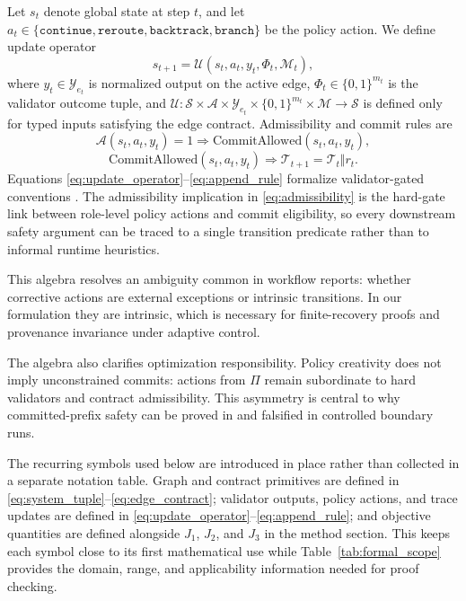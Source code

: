 \documentclass{article} %
\begin{document}
Let $s_t$ denote global state at step $t$, and let $a_t\in\{\texttt{continue},\texttt{reroute},\texttt{backtrack},\texttt{branch}\}$ be the policy action. We define update operator
\begin{equation}
s_{t+1}=\mathcal{U}(s_t,a_t,y_t,\Phi_t,\mathcal{M}_t),
\label{eq:update_operator}
\end{equation}
where $y_t\in\mathcal{Y}_{e_t}$ is normalized output on the active edge, $\Phi_t\in\{0,1\}^{m_t}$ is the validator outcome tuple, and $\mathcal{U}:\mathcal{S}\times\mathcal{A}\times\mathcal{Y}_{e_t}\times\{0,1\}^{m_t}\times\mathcal{M}\to\mathcal{S}$ is defined only for typed inputs satisfying the edge contract. Admissibility and commit rules are
\begin{equation}
\mathcal{A}(s_t,a_t,y_t)=1\Rightarrow \mathrm{CommitAllowed}(s_t,a_t,y_t),
\label{eq:admissibility}
\end{equation}
\begin{equation}
\mathrm{CommitAllowed}(s_t,a_t,y_t)\Rightarrow \mathcal{T}_{t+1}=\mathcal{T}_t\Vert r_t.
\label{eq:append_rule}
\end{equation}
Equations \eqref{eq:update_operator}--\eqref{eq:append_rule} formalize validator-gated conventions \citep{sawant2026,chang2025,song2026b}.
The admissibility implication in \eqref{eq:admissibility} is the hard-gate link between role-level policy actions and commit eligibility, so every downstream safety argument can be traced to a single transition predicate rather than to informal runtime heuristics.

This algebra resolves an ambiguity common in workflow reports: whether corrective actions are external exceptions or intrinsic transitions. In our formulation they are intrinsic, which is necessary for finite-recovery proofs and provenance invariance under adaptive control.

The algebra also clarifies optimization responsibility. Policy creativity does not imply unconstrained commits: actions from $\Pi$ remain subordinate to hard validators and contract admissibility. This asymmetry is central to why committed-prefix safety can be proved in  and falsified in controlled boundary runs.

The recurring symbols used below are introduced in place rather than collected in a separate notation table. Graph and contract primitives are defined in \eqref{eq:system_tuple}--\eqref{eq:edge_contract}; validator outputs, policy actions, and trace updates are defined in \eqref{eq:update_operator}--\eqref{eq:append_rule}; and objective quantities are defined alongside $J_1$, $J_2$, and $J_3$ in the method section. This keeps each symbol close to its first mathematical use while Table~\ref{tab:formal_scope} provides the domain, range, and applicability information needed for proof checking.
\end{document}
